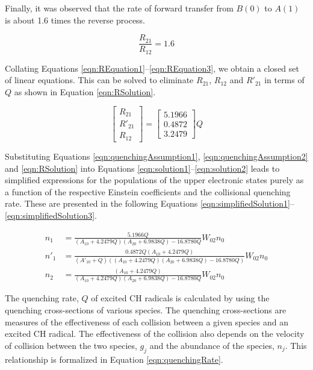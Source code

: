 Finally, it was observed\cite{1985-garland-b} that the rate of forward transfer from \(B(0)\) to \(A(1)\) is about 1.6 times the reverse process.

\begin{equation}
  \frac{R_{21}}{R_{12}} = 1.6
  \label{eqn:REquation3}
\end{equation}

Collating Equations \ref{eqn:REquation1}--\ref{eqn:REquation3}, we obtain a closed set of linear equations.
This can be solved to eliminate \(R_{21}\), \(R_{12}\) and \(R'_{21}\) in terms of \(Q\) as shown in Equation \ref{eqn:RSolution}.

\begin{equation}
  \left[
    \begin{matrix}
      R_{21}\\
      R'_{21}\\
      R_{12}
    \end{matrix}
  \right] = \left[
    \begin{matrix}
      5.1966\\
      0.4872\\
      3.2479
    \end{matrix}
  \right] Q
  \label{eqn:RSolution}
\end{equation}

Substituting Equations \ref{eqn:quenchingAssumption1}, \ref{eqn:quenchingAssumption2} and \ref{eqn:RSolution} into Equations \ref{eqn:solution1}--\ref{eqn:solution2} leads to simplified expressions for the populations of the upper electronic states purely as a function of the respective Einstein coefficients and the collisional quenching rate.
These are presented in the following Equations \ref{eqn:simplifiedSolution1}--\ref{eqn:simplifiedSolution3}.

\begin{align}
  n_1 &= \frac{ 5.1966Q }{ ( A_{10} + 4.2479Q )( A_{20} + 6.9838Q ) - 16.8780Q } W_{02}n_0
  \label{eqn:simplifiedSolution1}\\
  n'_1 &= \frac{ 0.4872Q( A_{10} + 4.2479Q ) }{ ( A'_{10} + Q ) \left( ( A_{10} + 4.2479Q )( A_{20} + 6.9838Q ) - 16.8780Q \right) } W_{02}n_0
  \label{eqn:simplifiedSolution2}\\
  n_2 &= \frac{ ( A_{10} + 4.2479Q ) }{ ( A_{10} + 4.2479Q )( A_{20} + 6.9838Q ) - 16.8780Q } W_{02}n_0
  \label{eqn:simplifiedSolution3}
\end{align}

The quenching rate, \(Q\) of excited CH radicals is calculated by using the quenching cross-sections of various species.
The quenching cross-sections are measures of the effectiveness of each collision between a given species and an excited CH radical.
The effectiveness of the collision also depends on the velocity of collision between the two species, \(g_j\) and the abundance of the species, \(n_j\).
This relationship is formalized in Equation \ref{eqn:quenchingRate}.


